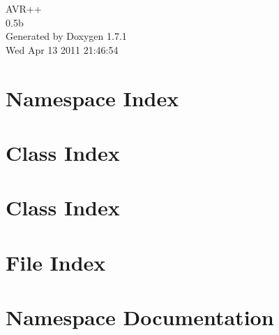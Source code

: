 \documentclass[a4paper]{book}
\begin{document}
\hypersetup{pageanchor=false}
\begin{titlepage}
\vspace*{7cm}
\begin{center}
{\Large AVR++ \\[1ex]\large 0.5b }\\
\vspace*{1cm}
{\large Generated by Doxygen 1.7.1}\\
\vspace*{0.5cm}
{\small Wed Apr 13 2011 21:46:54}\\
\end{center}
\end{titlepage}
\clearemptydoublepage
{}
\tableofcontents
\clearemptydoublepage
{}
\hypersetup{pageanchor=true}
\chapter{Namespace Index}

\chapter{Class Index}

\chapter{Class Index}

\chapter{File Index}

\chapter{Namespace Documentation}








\end{document}
